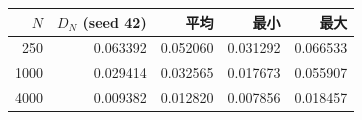 \begin{tabular}{rrrrr}\toprule
$N$ & $D_N$ (seed 42) & 平均 & 最小 & 最大 \\
\midrule
250 & 0.063392 & 0.052060 & 0.031292 & 0.066533 \\
1000 & 0.029414 & 0.032565 & 0.017673 & 0.055907 \\
4000 & 0.009382 & 0.012820 & 0.007856 & 0.018457 \\
\bottomrule\end{tabular}
